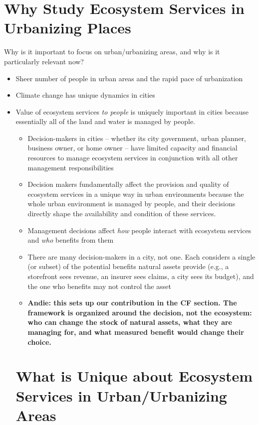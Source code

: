 \documentclass[12pt]{article}
\begin{document}
\section{Why Study Ecosystem Services in Urbanizing Places}\label{sec:intro}
Why is it important to focus on urban/urbanizing areas, and why is it particularly relevant now?
\begin{itemize}
  \item Sheer number of people in urban areas and the rapid pace of urbanization
  \item Climate change has unique dynamics in cities 
  \item Value of ecosystem services \textit{to people} is uniquely important in cities because essentially all of the land and water is managed by people. 
  \begin{itemize}
    \item Decision-makers in cities -- whether its city government, urban planner, business owner, or home owner -- have limited capacity and financial resources to manage ecosystem services in conjunction with all other management responsibilities
    \item Decision makers fundamentally affect the provision and quality of ecosystem services in a unique way in urban environments because the whole urban environment is managed by people, and their decisions directly shape the availability and condition of these services.
    \item Management decisions affect \textit{how} people interact with ecosystem services and \textit{who} benefits from them 
    \item There are many decision-makers in a city, not one. Each considers a single (or subset) of the potential benefits natural assets provide (e.g., a storefront sees revenue, an insurer sees claims, a city sees its budget), and the one who benefits may not control the asset
    \item \textbf{Andie: this sets up our contribution in the CF section. The framework is organized around the decision, not the ecosystem: who can change the stock of natural assets, what they are managing for, and what measured benefit would change their choice.}
  \end{itemize}

\section{What is Unique about Ecosystem Services in Urban/Urbanizing Areas}\label{sec:background}



\end{itemize}
\end{document}
